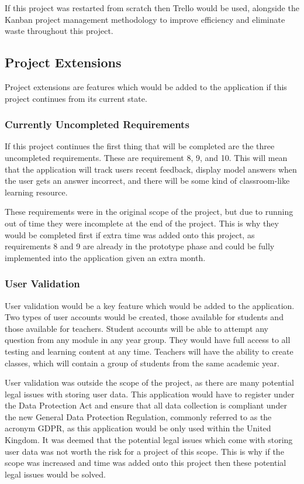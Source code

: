 \documentclass{article}
\begin{document}
If this project was restarted from scratch then Trello would be used, alongside the Kanban project management methodology to improve efficiency and eliminate waste throughout this project. \par

\subsection{Project Extensions}

Project extensions are features which would be added to the application if this project continues from its current state. 

\subsubsection{Currently Uncompleted Requirements}

If this project continues the first thing that will be completed are the three uncompleted requirements. These are requirement 8, 9, and 10. This will mean that the application will track users recent feedback, display model answers when the user gets an answer incorrect, and there will be some kind of classroom-like learning resource. \par

These requirements were in the original scope of the project, but due to running out of time they were incomplete at the end of the project. This is why they would be completed first if extra time was added onto this project, as requirements 8 and 9 are already in the prototype phase and could be fully implemented into the application given an extra month. 

\subsubsection{User Validation}

User validation would be a key feature which would be added to the application. Two types of user accounts would be created, those available for students and those available for teachers. Student accounts will be able to attempt any question from any module in any year group. They would have full access to all testing and learning content at any time. Teachers will have the ability to create classes, which will contain a group of students from the same academic year. \par

User validation was outside the scope of the project, as there are many potential legal issues with storing user data. This application would have to register under the Data Protection Act and ensure that all data collection is compliant under the new General Data Protection Regulation, commonly referred to as the acronym GDPR, as this application would be only used within the United Kingdom. It was deemed that the potential legal issues which come with storing user data was not worth the risk for a project of this scope. This is why if the scope was increased and time was added onto this project then these potential legal issues would be solved. \par
\end{document}
